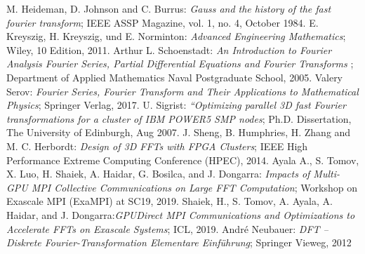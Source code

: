  M. Heideman, D. Johnson and C. Burrus: {\sl Gauss and the history of the fast fourier transform}; IEEE ASSP Magazine, vol. 1, no. 4, October 1984.
 E. Kreyszig, H. Kreyszig, und E. Norminton: {\sl Advanced Engineering Mathematics}; Wiley, 10 Edition, 2011.
 Arthur L. Schoenstadt: {\sl An Introduction to Fourier Analysis Fourier Series, Partial Diﬀerential Equations
and Fourier Transforms
}; Department of Applied Mathematics Naval Postgraduate School, 2005.
 Valery Serov: {\sl Fourier Series, Fourier Transform and Their Applications to Mathematical Physics}; Springer Verlag, 2017.
 U. Sigrist: {\sl “Optimizing parallel 3D fast Fourier transformations for a
cluster of IBM POWER5 SMP nodes}; Ph.D. Dissertation, The University of Edinburgh, Aug 2007.
J. Sheng, B. Humphries, H. Zhang and M. C. Herbordt: {\sl Design of 3D FFTs with FPGA Clusters}; IEEE High Performance Extreme Computing Conference (HPEC), 2014.
 Ayala A., S. Tomov, X. Luo, H. Shaiek, A. Haidar, G. Bosilca, and J. Dongarra: {\sl Impacts of Multi-GPU MPI Collective Communications on Large FFT Computation}; Workshop on Exascale MPI (ExaMPI) at SC19, 2019.
 Shaiek, H., S. Tomov, A. Ayala, A. Haidar, and J. Dongarra:{\sl GPUDirect MPI Communications and Optimizations to Accelerate FFTs on Exascale Systems}; ICL, 2019.
André Neubauer: {\sl DFT – Diskrete Fourier-Transformation Elementare Einführung}; Springer Vieweg, 2012
